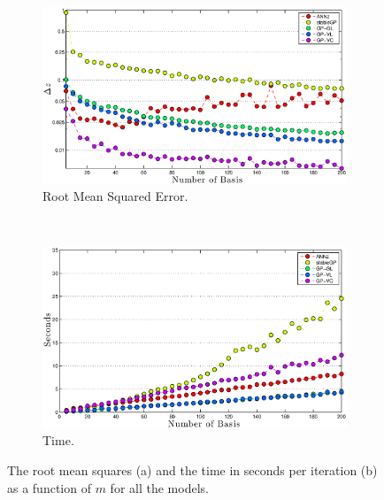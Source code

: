 \documentclass[useAMS,usenatbib,fleqn]{mn2e}
\begin{document}
\begin{figure}
        \centering
        
        \begin{subfigure}[b]{\columnwidth}
                \includegraphics[width=\textwidth]{figures/different-basis.eps}
                 \caption{Root Mean Squared Error.}
                 \label{fig-rmses}
        \end{subfigure}
	 ~
       \begin{subfigure}[b]{\columnwidth}
                \includegraphics[width=\textwidth]{figures/times.eps}
                 \caption{Time.}
                 \label{fig-time-seconds}
        \end{subfigure}

       \caption{The root mean squares (a) and the time in seconds per iteration (b) as a function of $m$ for all the models.}	
\end{figure}
\end{document}
